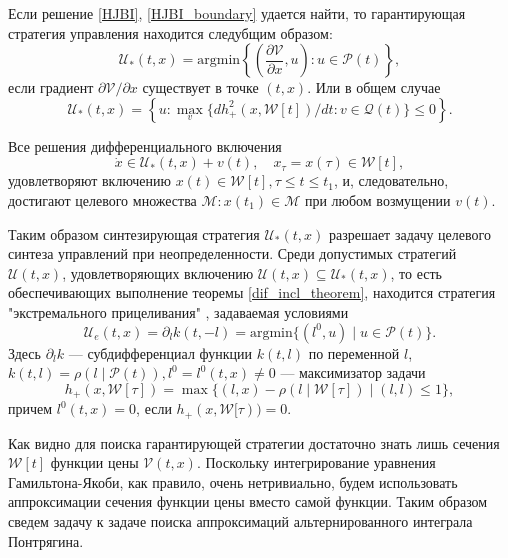 Если решение \eqref{HJBI}, \eqref{HJBI_boundary} удается найти, то гарантирующая стратегия управления
 находится следубщим образом:
\begin{equation}
    \mathcal{U}_*(t,x) = \mathrm{argmin} \left\{ \left( \frac{\partial \mathcal{V}}{\partial x},
     u \right) : u \in \mathcal{P}(t) \right\},
\end{equation}
если градиент \( \partial \mathcal{V} / \partial x \) существует в точке \( (t, x) \). Или в общем
 случае
\begin{equation}
    \mathcal{U}_*(t,x) = \left\{ u: \max_v \{ dh_+^2(x, \mathcal{W}[t]) / dt : v \in \mathcal{Q}(t) \} 
     \le 0 \right\}.
\end{equation}

\begin{theorem}\label{dif_incl_theorem}
    Все решения дифференциального включения
    \begin{equation*}
        \dot{x} \in \mathcal{U}_*(t,x) + v(t), \quad x_{\tau} = x(\tau) \in \mathcal{W}[t],
    \end{equation*}
    удовлетворяют включению \( x(t) \in \mathcal{W}[t] , \tau \le t \le t_1 \), и, следовательно,
     достигают целевого множества \( \mathcal{M} : x(t_1) \in \mathcal{M} \) при любом возмущении
     \( v(t) \). 
\end{theorem}

Таким образом синтезирующая стратегия \( \mathcal{U}_*(t,x) \) разрешает задачу целевого синтеза 
 управлений при неопределенности. Среди допустимых стратегий \( \mathcal{U}(t,x) \), удовлетворяющих
 включению \( \mathcal{U}(t,x) \subseteq \mathcal{U}_*(t,x) \), то есть обеспечивающих выполнение
 теоремы \eqref{dif_incl_theorem}, находится стратегия "экстремального прицеливания" , задаваемая
 условиями
\begin{equation}
    \mathcal{U}_e(t,x) = \partial_l k(t, -l) = \mathrm{arg min} \{(l^0, u) \mid u \in \mathcal{P}(t) \}.
\end{equation}
Здесь \( \partial_l k \) --- субдифференциал функции \( k(t, l) \) по переменной \( l \), \( k(t,l)
 = \rho(l \mid \mathcal{P}(t)), l^0 = l^0(t, x) \ne 0 \) --- максимизатор задачи 
\begin{equation}\label{extr_problem}
    h_+(x, \mathcal{W}[\tau]) = \max \{(l,x) - \rho(l \mid \mathcal{W}[\tau]) \mid (l,l) \le 1 \},
\end{equation}
причем \( l^0(t,x) = 0 \), если \( h_+(x, \mathcal{W}[\tau)) = 0 \).

Как видно для поиска гарантирующей стратегии достаточно знать лишь сечения \( \mathcal{W}[t] \) функции
 цены \( \mathcal{V}(t,x) \). Поскольку интегрирование уравнения Гамильтона-Якоби, как правило, очень 
 нетривиально, будем использовать аппроксимации сечения функции цены вместо самой функции. Таким 
 образом сведем задачу к задаче поиска аппроксимаций альтернированного интеграла Понтрягина.

